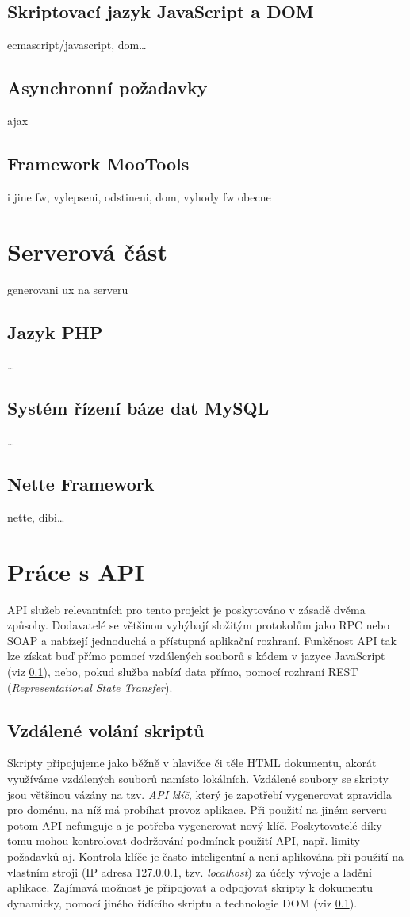 \subsection{Skriptovací jazyk JavaScript a DOM}\label{javaScript}
ecmascript/javascript, dom\ldots

\subsection{Asynchronní požadavky}\label{ajax}
ajax

\subsection{Framework MooTools}
i jine fw, vylepseni, odstineni, dom, vyhody fw obecne

\section{Serverová část}
generovani ux na serveru
\subsection{Jazyk PHP}
\ldots
\subsection{Systém řízení báze dat MySQL}
\ldots
\subsection{Nette Framework}
nette, dibi\ldots

\section{Práce s API}\label{api}
API služeb relevantních pro tento projekt je poskytováno v zásadě
dvěma způsoby. Dodavatelé se většinou vyhýbají
složitým protokolům jako RPC nebo SOAP a nabízejí jednoduchá a
přístupná aplikační rozhraní. Funkčnost API tak lze získat buď přímo
pomocí vzdálených souborů s kódem v jazyce JavaScript (viz
\ref{javaScript}), nebo, pokud služba nabízí data přímo, pomocí
rozhraní REST ({\it Representational State Transfer}).

\subsection{Vzdálené volání skriptů}
Skripty připojujeme jako běžně v hlavičce či těle HTML
dokumentu, akorát využíváme vzdálených souborů namísto lokálních.
Vzdálené soubory se skripty jsou většinou vázány na tzv. {\it API
klíč}, který je zapotřebí vygenerovat zpravidla pro doménu, na níž má
probíhat provoz aplikace. Při použití na jiném serveru potom API
nefunguje a je potřeba vygenerovat nový klíč. Poskytovatelé díky tomu
mohou kontrolovat dodržování podmínek použití API, např. limity
požadavků aj. Kontrola klíče je často inteligentní a není aplikována
při použití na vlastním stroji (IP adresa 127.0.0.1, tzv. {\it
localhost}) za účely vývoje a ladění aplikace. Zajímavá možnost je
připojovat a odpojovat skripty k dokumentu dynamicky, pomocí jiného
řídícího skriptu a technologie DOM (viz \ref{javaScript}).

